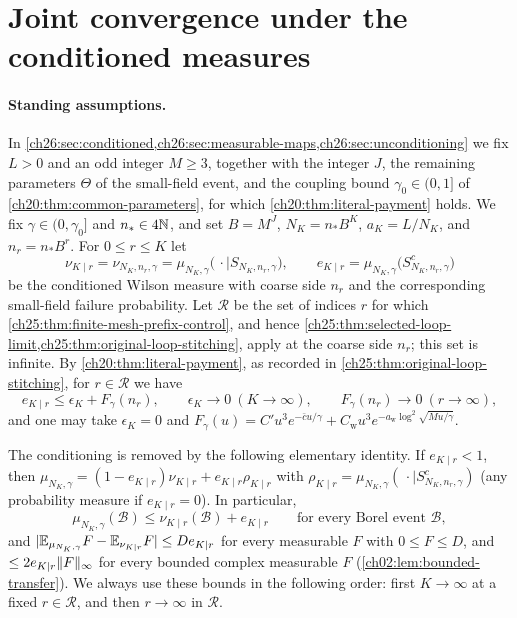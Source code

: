 \section{Joint convergence under the conditioned measures}\label{ch26:sec:conditioned}

\paragraph{Standing assumptions.}
In \cref{ch26:sec:conditioned,ch26:sec:measurable-maps,ch26:sec:unconditioning} we fix $L>0$ and an odd integer $M\ge3$, together with the integer $J$, the remaining parameters $\Theta$ of the small-field event, and the coupling bound $\gamma_0\in(0,1]$ of \cref{ch20:thm:common-parameters}, for which \cref{ch20:thm:literal-payment} holds. We fix $\gamma\in(0,\gamma_0]$ and $n_*\in4\mathbb N$, and set $B=M^J$, $N_K=n_*B^K$, $a_K=L/N_K$, and $n_r=n_*B^r$. For $0\le r\le K$ let
\[
 \nu_{K\mid r}=\nu_{N_K,n_r,\gamma}=\mu_{N_K,\gamma}\bigl(\,\cdot\mid S_{N_K,n_r,\gamma}\bigr),\qquad e_{K\mid r}=\mu_{N_K,\gamma}\bigl(S_{N_K,n_r,\gamma}^c\bigr)
\]
be the conditioned Wilson measure with coarse side $n_r$ and the corresponding small-field failure probability. Let $\mathcal R$ be the set of indices $r$ for which \cref{ch25:thm:finite-mesh-prefix-control}, and hence \cref{ch25:thm:selected-loop-limit,ch25:thm:original-loop-stitching}, apply at the coarse side $n_r$; this set is infinite. By \cref{ch20:thm:literal-payment}, as recorded in \cref{ch25:thm:original-loop-stitching}, for $r\in\mathcal R$ we have
\begin{equation}\label{ch26:eq:failure-bound}
 e_{K\mid r}\le\epsilon_K+F_\gamma(n_r),\qquad \epsilon_K\to0\ (K\to\infty),\qquad F_\gamma(n_r)\to0\ (r\to\infty),
\end{equation}
and one may take $\epsilon_K=0$ and $F_\gamma(u)=C'u^3e^{-\bar cu/\gamma}+C_{\mathrm w}u^3e^{-a_{\mathrm w}\log^2\sqrt{Mu/\gamma}}$.

The conditioning is removed by the following elementary identity. If $e_{K\mid r}<1$, then $\mu_{N_K,\gamma}=(1-e_{K\mid r})\nu_{K\mid r}+e_{K\mid r}\rho_{K\mid r}$ with $\rho_{K\mid r}=\mu_{N_K,\gamma}(\,\cdot\mid S^c_{N_K,n_r,\gamma})$ (any probability measure if $e_{K\mid r}=0$). In particular,
\begin{equation}\label{ch26:eq:tail-transfer}
 \mu_{N_K,\gamma}(\mathcal B)\le\nu_{K\mid r}(\mathcal B)+e_{K\mid r}\qquad\text{for every Borel event }\mathcal B,
\end{equation}
and $\lvert \mathbb E_{\mu_{N_K,\gamma}}F-\mathbb E_{\nu_{K\mid r}}F\rvert\le De_{K\mid r}$ for every measurable $F$ with $0\le F\le D$, and $\le2e_{K\mid r}\lVert F\rVert_\infty$ for every bounded complex measurable $F$ (\cref{ch02:lem:bounded-transfer}). We always use these bounds in the following order: first $K\to\infty$ at a fixed $r\in\mathcal R$, and then $r\to\infty$ in $\mathcal R$.

